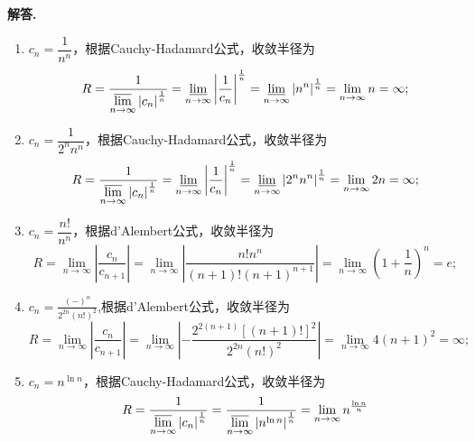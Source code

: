 \documentclass[11pt]{ctexart}
\newenvironment{solution}{\par\noindent\textbf{解答. }}{\par}
\begin{document}
\begin{solution}
    \begin{enumerate}[(1)]
        \item $c_n = \dfrac{1}{n^n}$，根据Cauchy-Hadamard公式，收敛半径为
            \begin{equation*}
            R = \frac{1}{\varlimsup\limits_{n\to\infty}\left|c_n\right|^{\frac{1}{n}}}
              = \varliminf\limits_{n\to\infty}\left|\frac{1}{c_n}\right|^{\frac{1}{n}}
              = \varliminf\limits_{n\to\infty}\left|n^n\right|^{\frac{1}{n}}
              = \lim_{n\to\infty} n
              = \infty;
            \end{equation*}
        \item $c_n = \dfrac{1}{2^nn^n}$，根据Cauchy-Hadamard公式，收敛半径为
            \begin{equation*}
            R = \frac{1}{\varlimsup\limits_{n\to\infty}\left|c_n\right|^{\frac{1}{n}}}
              = \varliminf\limits_{n\to\infty}\left|\frac{1}{c_n}\right|^{\frac{1}{n}}
              = \varliminf\limits_{n\to\infty}\left|2^nn^n\right|^{\frac{1}{n}}
              = \lim_{n\to\infty} 2n
              = \infty;
            \end{equation*}
        \item $c_n = \dfrac{n!}{n^n}$，根据d'Alembert公式，收敛半径为
            \begin{equation*}
            R = \lim_{n\to\infty}\left|\frac{c_n}{c_{n+1}}\right|
              = \lim_{n\to\infty}\left|\frac{n!n^n}{(n+1)!(n+1)^{n+1}}\right|
              = \lim_{n\to\infty}(1+\frac{1}{n})^n
              = e;
            \end{equation*}
        \item $c_n = \frac{(-)^n}{2^{2n}(n!)^2}$,根据d'Alembert公式，收敛半径为
            \begin{equation*}
            R = \lim_{n\to\infty}\left|\frac{c_n}{c_{n+1}}\right|
              = \lim_{n\to\infty}\left|-\frac{2^{2(n+1)}[(n+1)!]^2}{2^{2n}(n!)^2}\right|
              = \lim_{n\to\infty}4(n+1)^2
              = \infty;
            \end{equation*}
        \item $c_n = n^{\ln{n}}$，根据Cauchy-Hadamard公式，收敛半径为
            \begin{equation*}
            R = \frac{1}{\varlimsup\limits_{n\to\infty}\left|c_n\right|^{\frac{1}{n}}}
              = \frac{1}{\varlimsup\limits_{n\to\infty}\left|n^{\ln{n}}\right|^{\frac{1}{n}}}
              = \lim_{n\to\infty}n^{\frac{\ln{n}}{n}}

\end{equation*}
\end{enumerate}
\end{solution}
\end{document}
